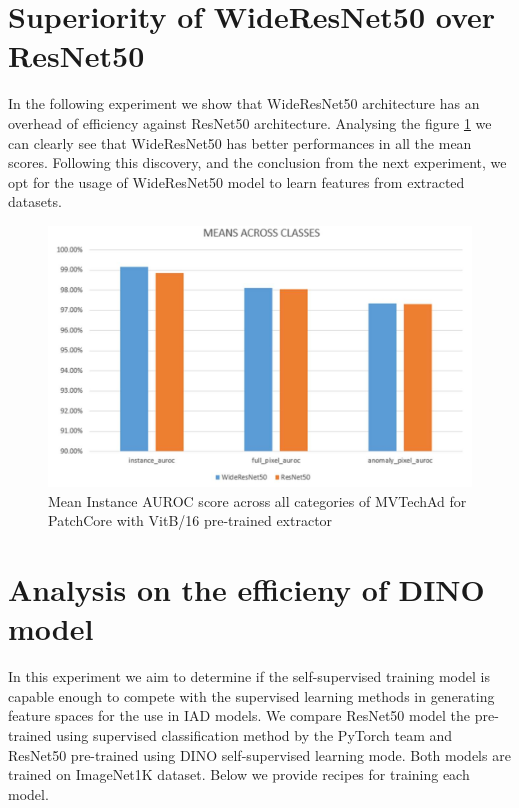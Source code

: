 \section{Superiority of WideResNet50 over ResNet50}
In the following experiment we show that WideResNet50 architecture has an overhead of efficiency against ResNet50 architecture. Analysing the figure \ref{fig:resnet_vs_wideresnet} we can clearly see that WideResNet50 has better performances in all the mean scores. Following this discovery, and the conclusion from the next experiment, we opt for the usage of WideResNet50 model to learn features from extracted datasets.

\begin{figure}[h]
	\begin{center}
		\includegraphics[width=1.0\linewidth]{Chapter_4/resnet_vs_wideresnet.png}
	\end{center}
	\caption{Mean Instance AUROC score across all categories of MVTechAd for PatchCore with VitB/16 pre-trained extractor}
	\label{fig:resnet_vs_wideresnet}
\end{figure}

\section{Analysis on the efficieny of DINO model}
\label{sec:dino_tests}
In this experiment we aim to determine if the self-supervised training model is capable enough to compete with the supervised learning methods in generating feature spaces for the use in IAD models. We compare ResNet50 model the pre-trained using supervised classification method by the PyTorch team and ResNet50 pre-trained using DINO self-supervised learning mode. Both models are trained on ImageNet1K dataset. Below we provide recipes for training each model.

